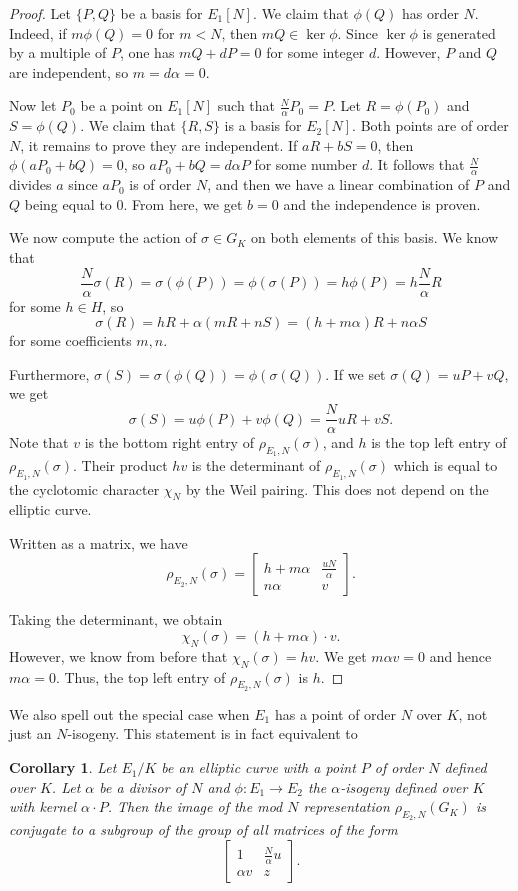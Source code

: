 \documentclass[10pt,leqno]{amsart}
\newcommand\m[1]{\begin{bmatrix}#1\end{bmatrix}}
\newtheorem{corollary}[theorem]{Corollary}
\theoremstyle{definition}
\theoremstyle{remark}
\numberwithin{theorem}{section}
\begin{document}
\begin{proof}
    Let $\{P, Q\}$ be a basis for $E_1[N]$. We claim that $\phi(Q)$ has order $N$. Indeed, if $m\phi(Q)=0$ for $m<N$, then $mQ\in \ker \phi$. Since $\ker \phi$ is generated by a multiple of $P$, one has $mQ+d P=0$ for some integer $d$. However, $P$ and $Q$ are independent, so $m=d\alpha=0$. 

    Now let $P_0$ be a point on $E_1[N]$ such that $\frac{N}{\alpha} P_0=P$. Let $R=\phi(P_0)$ and $S=\phi(Q)$. We claim that $\{R,S\}$ is a basis for $E_2[N]$. Both points are of order $N$, it remains to prove they are independent. If $aR+bS=0$, then $\phi(aP_0+bQ)=0$, so $aP_0+bQ=d\alpha P$ for some number $d$. It follows that $\frac{N}{\alpha}$ divides $a$ since $aP_0$ is of order $N$, and then we have a linear combination of $P$ and $Q$ being equal to $0$. From here, we get $b=0$ and the independence is proven. 
    
    
    We now compute the action of $\sigma \in G_K$ on both elements of this basis. We know that $$\frac{N}{\alpha}\sigma(R)=\sigma(\phi(P))=\phi(\sigma(P))=h\phi(P)=h \frac{N}{\alpha} R$$ for some $h \in H$,  so $$\sigma(R)=hR+\alpha (mR+nS)=(h+m\alpha)R+n\alpha S$$ for some coefficients $m,n$.

    Furthermore, $\sigma(S)=\sigma(\phi(Q))=\phi(\sigma(Q))$. If we set $\sigma(Q)=uP+vQ$, we get $$\sigma(S)=u\phi(P)+v\phi(Q)=\frac{N}{\alpha}uR+vS.$$
    Note that  $v$ is the bottom right entry of $\rho_{E_1, N}(\sigma)$, and $h$ is the top left entry of $\rho_{E_1, N}(\sigma)$. Their product $hv$ is the determinant of $\rho_{E_1, N}(\sigma)$ which is equal to the cyclotomic character $\chi_N$ by the Weil pairing. This does not depend on the elliptic curve.

  
    Written as a matrix, we have $$\rho_{E_2, N}(\sigma)=\m{h+m\alpha & \frac{uN}{\alpha} \\ n\alpha & v}.$$

    Taking the determinant, we obtain $$\chi_N(\sigma)=(h+m\alpha)\cdot v.$$ 
    However, we know from before that $\chi_N(\sigma)=hv$. We get $m\alpha v=0$ and hence $m\alpha=0$. Thus, the top left entry of $\rho_{E_2, N}(\sigma)$ is $h$.
\end{proof}

We also spell out the special case when $E_1$ has a point of order $N$ over $K$, not just an $N$-isogeny. This statement is in fact equivalent to \cite[Proposition 4.4]{bourdon-najman}

\begin{corollary}\label{slozeni}
    Let $E_1/K$ be an elliptic curve with a point $P$ of order $N$ defined over $K$. Let $\alpha$ be a divisor of $N$ and $\phi:E_1 \to E_2$ the  $\alpha$-isogeny defined over $K$ with kernel $\alpha\cdot P$. Then the image of the mod $N$ representation $\rho_{E_2, N}(G_K)$ is conjugate to a subgroup of the group of all matrices of the form $$\m{ 1 & \frac{N}{\alpha}u \\ \alpha v & z}.$$
\end{corollary}
\end{document}
